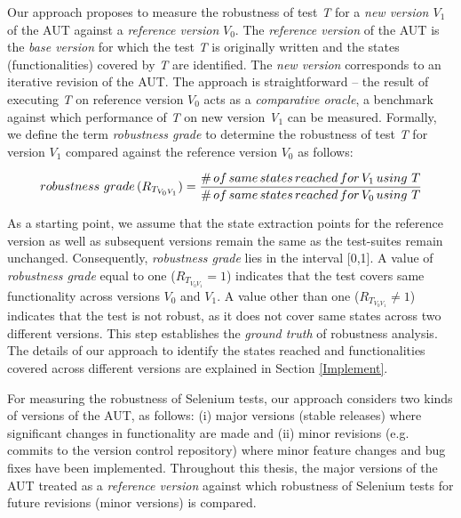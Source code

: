 Our approach proposes to measure the robustness of test \textit{T} for a \textit{new version $V_{1}$} of the AUT against a \textit{reference version} \textit{$V_{0}$}. The \textit{reference version} of the AUT is the \textit{base version} for which the test \textit{T} is originally written and the states (functionalities) covered by \textit{T} are identified. The \textit{new version} corresponds to an iterative revision of the AUT. The approach is straightforward -- the result of executing \textit{T} on reference version \textit{$V_{0}$} acts as a \textit{comparative oracle}, a benchmark against which performance of \textit{T} on new version \textit{V$_{1}$} can be measured. Formally, we define the term \textit{
robustness grade} to determine the robustness of test \textit{T} for version \textit{$V_{1}$} compared against the reference version \textit{$V_{0}$} as follows:

\begin{equation}
robustness \thinspace \thinspace grade \thinspace (R_{T_{V_{0}V_{1}}}) = \displaystyle \frac{\#\thinspace of \thinspace same \thinspace states \thinspace reached \thinspace for \thinspace V_{1} \thinspace using \thinspace \thinspace T}{\# \thinspace of \thinspace same \thinspace states \thinspace reached  \thinspace for \thinspace V_{0} \thinspace using \thinspace \thinspace T}\normalsize
\label{test-case-robustness}
\vspace{0.5cm}
\end{equation}

As a starting point, we assume that the state extraction points for the reference version as well as subsequent versions remain the same as the test-suites remain unchanged. Consequently, \textit{
robustness grade} lies in the interval [0,1]. A value of \textit{
robustness grade} equal to one ($R_{T_{V_{0}V_{1}}}=1$) indicates that the test covers same functionality across versions \textit{$V_{0}$} and \textit{$V_{1}$}. A value other than one ($R_{T_{V_{0}V_{1}}}\neq 1$) indicates that the test is not robust, as it does not cover same states across two different versions. This step establishes the \textit{ground truth} of robustness analysis. The details of our approach to identify the states reached and functionalities covered across different versions are explained in Section \ref{Implement}.

For measuring the robustness of Selenium tests, our approach considers two kinds of versions of the AUT, as follows: (i) major versions (stable releases) where significant changes in functionality are made and (ii) minor revisions (e.g. commits to the version control repository) where minor feature changes and bug fixes have been implemented. Throughout this thesis, the major versions of the AUT treated as a \textit{reference version} against which robustness of Selenium tests for future revisions (minor versions) is compared. 

